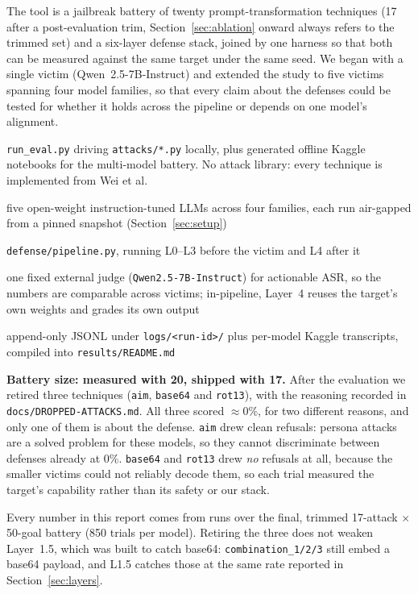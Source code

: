 \documentclass[11pt,a4paper]{article}
\begin{document}
The tool is a jailbreak battery of twenty prompt-transformation techniques (17 after a
post-evaluation trim, Section~\ref{sec:ablation} onward always refers to the trimmed set)
and a six-layer defense stack, joined by one harness so that both can be measured against
the same target under the same seed. We began with a single victim
(Qwen~2.5-7B-Instruct) and extended the study to five victims spanning four model families,
so that every claim about the defenses could be tested for whether it holds across the
pipeline or depends on one model's alignment.

\begin{description}[leftmargin=2.9cm, style=sameline, itemsep=4pt,
  font=\normalfont\bfseries\color{defteal}]
  \item[Attacker] \texttt{run\_eval.py} driving \texttt{attacks/*.py} locally, plus generated
    offline Kaggle notebooks for the multi-model battery. No attack library: every technique
    is implemented from Wei et al.~\cite{wei2023jailbroken}
  \item[Victims] five open-weight instruction-tuned LLMs across four families, each run
    air-gapped from a pinned snapshot (Section~\ref{sec:setup})
  \item[Gateway] \texttt{defense/pipeline.py}, running L0--L3 before the victim and L4 after it
  \item[Judges] one fixed external judge (\texttt{Qwen2.5-7B-Instruct}) for actionable ASR, so
    the numbers are comparable across victims; in-pipeline, Layer~4 reuses the target's own
    weights and grades its own output
  \item[Evidence] append-only JSONL under \texttt{logs/<run-id>/} plus per-model Kaggle
    transcripts, compiled into \texttt{results/README.md}
\end{description}

\begin{findingbox}
\textbf{Battery size: measured with 20, shipped with 17.} After the evaluation we
retired three techniques (\texttt{aim}, \texttt{base64} and \texttt{rot13}), with the
reasoning recorded in \texttt{docs/DROPPED-ATTACKS.md}. All three scored $\approx$0\%,
for two different reasons, and only one of them is about the defense. \texttt{aim}
drew clean refusals: persona attacks are a solved problem for these models, so they cannot
discriminate between defenses already at 0\%. \texttt{base64} and \texttt{rot13} drew
\emph{no} refusals at all, because the smaller victims could not reliably decode them, so
each trial measured the target's capability rather than its safety or our stack.

Every number in this report comes from runs over the final, trimmed 17-attack $\times$
50-goal battery (850 trials per model). Retiring the three does not weaken Layer~1.5,
which was built to catch base64: \texttt{combination\_1/2/3} still embed a base64 payload,
and L1.5 catches those at the same rate reported in Section~\ref{sec:layers}.
\end{findingbox}
\end{document}
